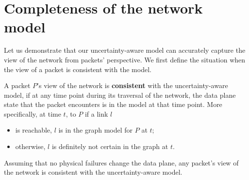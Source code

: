 \appendix 

\section{Completeness of the network model} \label{sec:proof}

Let us demonstrate that our uncertainty-aware model can accurately capture the
view of the network from packets' perspective. We first define the situation
when the view of a packet is consistent with the model. 

  \vspace{-0.1in}
\begin{definition} A packet $P$'s view of the network is {\bf consistent} with
the uncertainty-aware model, if at any time point during its traversal of the
network, the data plane state that the packet encounters is in the model at
that time point. More specifically, at time $t$, to $P$ if a link $l$
\begin{itemize}[noitemsep,topsep=0pt,leftmargin=*] 
\item is reachable, $l$ is in the graph model for $P$ at $t$;
\item otherwise, $l$ is definitely not certain in the graph at $t$.
\end{itemize} \end{definition}
  \vspace{-0.1in}

  \vspace{-0.1in}
\begin{theorem} Assuming that no physical failures change the data plane, any
packet's view of the network is consistent with the uncertainty-aware model.
\end{theorem}
  \vspace{-0.1in}


